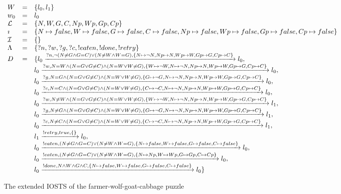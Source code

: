   \begin{figure}[ht]
  \begin{center}
  $\begin{array}{lcl}
  W & = & \{l_0, l_1\} \\
  w_0 & = & l_0 \\
  \mathcal{L} & = & \{N,W,G,C,Np, Wp, Gp, Cp\} \\
  \imath & = & \{N \mapsto false, W \mapsto false, G \mapsto false, C \mapsto false,Np \mapsto false, Wp \mapsto false, Gp \mapsto false, Cp \mapsto false\} \\
  \mathcal{I} & = & \{\} \\
  \Lambda & = & \{?n, ?w, ?g, ?c, !eaten, !done, !retry\} \\
  D & = & \{l_0\xrightarrow{?n, \neg(N \neq G \land G=C)\lor(N \neq W \land W=G), \{N \mapsto \neg N, Np \mapsto N, Wp \mapsto W, Gp \mapsto G, Cp \mapsto C\}}l_0, \\
  & & l_0\xrightarrow{?w, N=W \land (N = G \lor G\neq C)\land (N = W \lor W\neq G), \{W \mapsto \neg W, N \mapsto \neg N, Np \mapsto N, Wp \mapsto W, Gp \mapsto G, Cp \mapsto C\}}l_0,\\
  & & l_0\xrightarrow{?g, N=G \land (N = G \lor G\neq C)\land (N = W \lor W\neq G), \{G \mapsto \neg G, N \mapsto \neg N, Np \mapsto N, Wp \mapsto W, Gp \mapsto G, Cp \mapsto C\}}l_0,\\
  & & l_0\xrightarrow{?c, N=C \land (N = G \lor G\neq C)\land (N = W \lor W\neq G), \{C \mapsto \neg C, N \mapsto \neg N, Np \mapsto N, Wp \mapsto W, Gp \mapsto G, Cp \mapsto C\}}l_0,\\
  & & l_0\xrightarrow{?w, N\neq W \land (N = G \lor G\neq C)\land (N = W \lor W\neq G), \{W \mapsto \neg W, N \mapsto \neg N, Np \mapsto N, Wp \mapsto W, Gp \mapsto G, Cp \mapsto C\}}l_1,\\
  & & l_0\xrightarrow{?g, N\neq G \land (N = G \lor G\neq C)\land (N = W \lor W\neq G), \{G \mapsto \neg G, N \mapsto \neg N, Np \mapsto N, Wp \mapsto W, Gp \mapsto G, Cp \mapsto C\}}l_1,\\
  & & l_0\xrightarrow{?c, N\neq C \land (N = G \lor G\neq C)\land (N = W \lor W\neq G), \{C \mapsto \neg C, N \mapsto \neg N, Np \mapsto N, Wp \mapsto W, Gp \mapsto G, Cp \mapsto C\}}l_1,\\
  & & l_1\xrightarrow{!retry,true,\{\}}l_0,\\
  & & l_0\xrightarrow{!eaten, (N \neq G \land G=C)\lor(N \neq W \land W=G), \{N \mapsto false, W \mapsto false, G \mapsto false, C \mapsto false\}}l_0, \\
  & & l_0\xrightarrow{!eaten, (N \neq G \land G=C)\lor(N \neq W \land W=G), \{N \mapsto Np, W \mapsto Wp, G \mapsto Gp, C \mapsto Cp\}}l_0, \\
  & & l_0\xrightarrow{!done, N \land W \land G \land C, \{N \mapsto false, W \mapsto false, G \mapsto false, C \mapsto false\}}l_0\}
  \end{array}$
  \end{center}
  \caption{The extended IOSTS of the farmer-wolf-goat-cabbage puzzle}
  \label{fig:sts-fwgc-extended}
  \end{figure}

